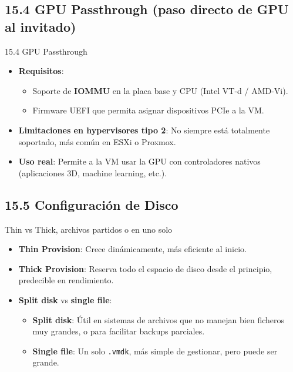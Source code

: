\documentclass{beamer}
\begin{document}
\subsection{15.4 GPU Passthrough (paso directo de GPU al invitado)}
\begin{frame}{15.4 GPU Passthrough}
	\begin{itemize}
		\item \textbf{Requisitos}:
			\begin{itemize}
				\item Soporte de \textbf{IOMMU} en la placa base y CPU (Intel VT-d / AMD-Vi).
				\item Firmware UEFI que permita asignar dispositivos PCIe a la VM.
			\end{itemize}
		\item \textbf{Limitaciones en hypervisores tipo 2}: No siempre está totalmente soportado, más común en ESXi o Proxmox.
		\item \textbf{Uso real}: Permite a la VM usar la GPU con controladores nativos (aplicaciones 3D, machine learning, etc.).
	\end{itemize}
\end{frame}

\subsection{15.5 Configuración de Disco}
\begin{frame}{Thin vs Thick, archivos partidos o en uno solo}
	\begin{itemize}
		\item \textbf{Thin Provision}: Crece dinámicamente, más eficiente al inicio.
		\item \textbf{Thick Provision}: Reserva todo el espacio de disco desde el principio, predecible en rendimiento.
		\item \textbf{Split disk} vs \textbf{single file}:
			\begin{itemize}
				\item \textbf{Split disk}: Útil en sistemas de archivos que no manejan bien ficheros muy grandes, o para facilitar backups parciales.
				\item \textbf{Single file}: Un solo \texttt{.vmdk}, más simple de gestionar, pero puede ser grande.
			\end{itemize}
	\end{itemize}
\end{frame}
\end{document}
